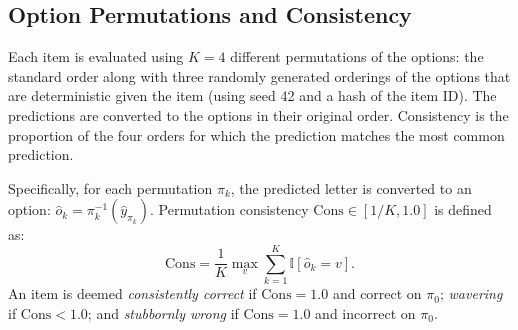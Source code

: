 \documentclass[sigconf,nonacm]{acmart}
\makeatletter
\DeclareRobustCommand{\_}{\ifmmode\nfss@text{\textunderscore}\else\textunderscore\allowbreak\fi}
\makeatother
\begin{document}
\subsection{Option Permutations and Consistency}
Each item is evaluated using $K=4$ different permutations of the options: the standard order along with three randomly generated orderings of the options that are deterministic given the item (using seed 42 and a hash of the item ID). The predictions are converted to the options in their original order. Consistency is the proportion of the four orders for which the prediction matches the most common prediction.

Specifically, for each permutation $\pi_k$, the predicted letter is converted to an option: $\hat{o}_k = \pi_k^{-1}(\hat{y}_{\pi_k})$. Permutation consistency $\text{Cons} \in [1/K, 1.0]$ is defined as:
\begin{equation}
    \text{Cons} = \frac{1}{K} \max_{v} \sum_{k=1}^K \mathbb{I}[\hat{o}_k = v].
\end{equation}
An item is deemed \textit{consistently correct} if $\text{Cons} = 1.0$ and correct on $\pi_0$; \textit{wavering} if $\text{Cons} < 1.0$; and \textit{stubbornly wrong} if $\text{Cons} = 1.0$ and incorrect on $\pi_0$.
\end{document}
